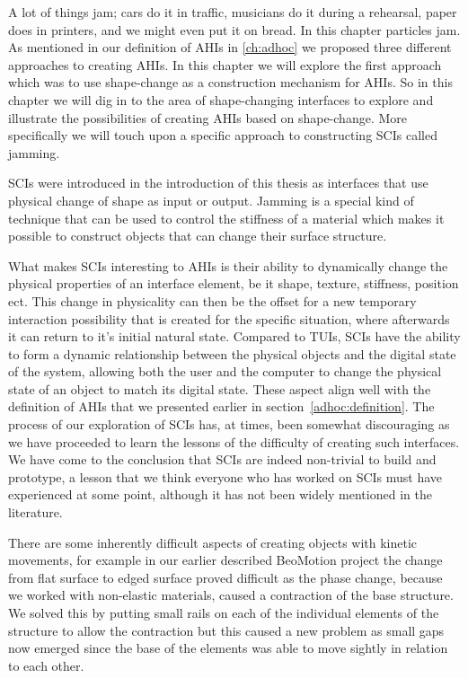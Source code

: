 

A lot of things jam; cars do it in traffic, musicians do it during a rehearsal, paper does in printers, and we might even put it on bread.
In this chapter particles jam.
\blank
As mentioned in our definition of AHIs in \autoref{ch:adhoc} we proposed three different approaches to creating AHIs.
In this chapter we will explore the first approach which was to use shape-change as a construction mechanism for AHIs.
So in this chapter we will dig in to the area of shape-changing interfaces to explore and illustrate the possibilities of creating AHIs based on shape-change.
More specifically we will touch upon a specific approach to constructing SCIs called jamming.

SCIs were introduced in the introduction of this thesis as interfaces that use physical change of shape as input or output.
Jamming is a special kind of technique that can be used to control the stiffness of a material which makes it possible to construct objects that can change their surface structure.

What makes SCIs interesting to AHIs is their ability to dynamically change the physical properties of an interface element, be it shape, texture, stiffness, position ect.
This change in physicality can then be the offset for a new temporary interaction possibility that is created for the specific situation, where afterwards it can return to it's initial natural state.
Compared to TUIs, SCIs have the ability to form a dynamic relationship between the physical objects and the digital state of the system, allowing both the user and the computer to change the physical state of an object to match its digital state.
These aspect align well with the definition of AHIs that we presented earlier in section~\ref{adhoc:definition}.
\blank
The process of our exploration of SCIs has, at times, been somewhat discouraging as we have proceeded to learn the lessons of the difficulty of creating such interfaces.
We have come to the conclusion that SCIs are indeed non-trivial to build and prototype, a lesson that we think everyone who has worked on SCIs must have experienced at some point, although it has not been widely mentioned in the literature. 

There are some inherently difficult aspects of creating objects with kinetic movements, for example in our earlier described BeoMotion project the change from flat surface to edged surface proved difficult as the phase change, because we worked with non-elastic materials, caused a contraction of the base structure.
We solved this by putting small rails on each of the individual elements of the structure to allow the contraction but this caused a new problem as small gaps now emerged since the base of the elements was able to move sightly in relation to each other.

